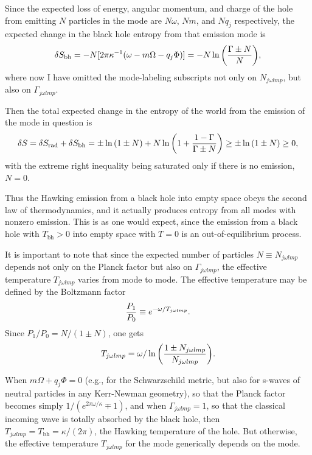 \documentclass[12pt]{article} \usepackage{latexsym}
\begin{document}
Since the expected loss of energy, angular momentum, and charge of the
hole from emitting $N$ particles in the mode are $N\omega$, $Nm$, and
$Nq_j$ respectively, the expected change in the black hole entropy
from that emission mode is
 \begin{equation}
 \delta S_{\mathrm{bh}} = - N [2\pi\kappa^{-1}(\omega-m\Omega-q_j\Phi)]
  = - N \ln{\left({\Gamma \pm N \over N}\right)},
 \label{eq:5c}
 \end{equation}
where now I have omitted the mode-labeling subscripts not only on
$N_{j\omega lmp}$, but also on $\Gamma_{j\omega lmp}$.

Then the total expected change in the entropy of the world from the
emission of the mode in question is
 \begin{equation}
 \delta S = \delta S_{\mathrm{rad}} + \delta S_{\mathrm{bh}}
  = \pm \ln{(1\pm N)} 
      +N\ln{\left(1+{1-\Gamma \over \Gamma \pm N} \right)}
          \ge \pm \ln{(1\pm N)} \ge 0,
 \label{eq:5d}
 \end{equation}
with the extreme right inequality being saturated only if there is no
emission, $N=0$.

Thus the Hawking emission from a black hole into empty space obeys the
second law of thermodynamics, and it actually produces entropy from
all modes with nonzero emission.  This is as one would expect, since
the emission from a black hole with $T_{\mathrm{bh}} > 0$ into empty
space with $T=0$ is an out-of-equilibrium process.

It is important to note that since the expected number of particles $N
\equiv N_{j\omega lmp}$ depends not only on the Planck
factor but also on $\Gamma_{j\omega lmp}$, the effective temperature
$T_{j\omega lmp}$ varies from mode to mode.  The effective temperature
may be defined by the Boltzmann factor
 \begin{equation}
 {P_1 \over P_0} \equiv e^{-\omega/T_{j\omega lmp}}.
 \label{eq:8}
 \end{equation}
Since $P_1/P_0 = N/(1\pm N)$, one gets
 \begin{equation}
 T_{j\omega lmp} = 
  \omega/\ln{\left({1\pm N_{j\omega lmp}
    \over N_{j\omega lmp}}\right)}.
 \label{eq:8b}
 \end{equation}

When $m\Omega+q_j\Phi = 0$ (e.g., for the Schwarzschild metric, but also
for s-waves of neutral particles in any Kerr-Newman geometry), so that
the Planck factor becomes simply $1/(e^{2\pi\omega/\kappa} \mp 1)$,
and when $\Gamma_{j\omega lmp} = 1$, so that the classical incoming
wave is totally absorbed by the black hole, then $T_{j\omega lmp} =
T_{\mathrm{bh}} = \kappa/(2\pi)$, the Hawking temperature of the hole.
But otherwise, the effective temperature $T_{j\omega lmp}$ for the
mode generically depends on the mode.
\end{document}
